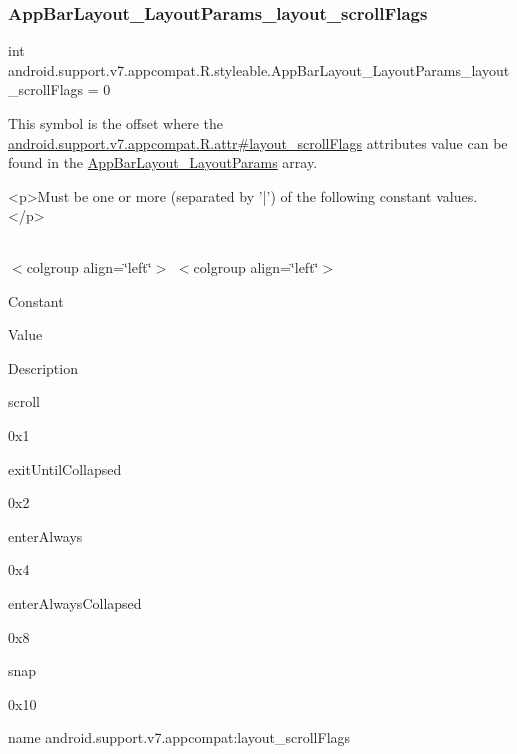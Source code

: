 \subsubsection{\texorpdfstring{App\+Bar\+Layout\+\_\+\+Layout\+Params\+\_\+layout\+\_\+scroll\+Flags}{AppBarLayout\_LayoutParams\_layout\_scrollFlags}}
{\footnotesize\ttfamily int android.\+support.\+v7.\+appcompat.\+R.\+styleable.\+App\+Bar\+Layout\+\_\+\+Layout\+Params\+\_\+layout\+\_\+scroll\+Flags = 0\hspace{0.3cm}{\ttfamily [static]}}

This symbol is the offset where the \hyperlink{classandroid_1_1support_1_1v7_1_1appcompat_1_1R_1_1attr_aa36aa8886bb09115b0225a3bd05e253d}{android.\+support.\+v7.\+appcompat.\+R.\+attr\#layout\+\_\+scroll\+Flags} attribute\textquotesingle{}s value can be found in the \hyperlink{classandroid_1_1support_1_1v7_1_1appcompat_1_1R_1_1styleable_a4a7cc1057032876bdbbf3596c54747f4}{App\+Bar\+Layout\+\_\+\+Layout\+Params} array.

\begin{DoxyVerb}      <p>Must be one or more (separated by '|') of the following constant values.</p>
\end{DoxyVerb}
 \tabulinesep=1mm
\begin{longtabu} spread 0pt [c]{*{0}{|X[-1]}|}
\hline
\end{longtabu}
$<$colgroup align=\char`\"{}left\char`\"{}$>$ $<$colgroup align=\char`\"{}left\char`\"{}$>$ 

Constant

Value

Description 

{\ttfamily scroll}

0x1

{\ttfamily exit\+Until\+Collapsed}

0x2

{\ttfamily enter\+Always}

0x4

{\ttfamily enter\+Always\+Collapsed}

0x8

{\ttfamily snap}

0x10

name android.\+support.\+v7.\+appcompat\+:layout\+\_\+scroll\+Flags \mbox{\label{classandroid_1_1support_1_1v7_1_1appcompat_1_1R_1_1styleable_a9f970a38797d2ee751b09ca5b920ecbe}} 
